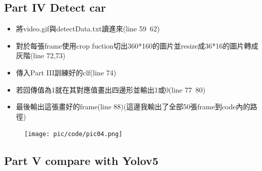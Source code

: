 \documentclass[12,a4paper]{article}
\begin{document}
\subsection{Part IV Detect car}
\begin{itemize}
    \item 將video.gif與detectData.txt讀進來(line 59~62)
    \item 對於每張frame使用crop fuction切出360*160的圖片並resize成36*16的圖片轉成灰階(line 72,73)
    \item 傳入Part III訓練好的clf(line 74)
    \item 若回傳值為1就在其對應值畫出四邊形並輸出1或0(line 77~80)
    \item 最後輸出這張畫好的frame(line 88)(這邊我輸出了全部50張frame到code內的路徑)
\end{itemize}
\begin{figure}[!ht]
\centering
\texttt{[image: pic/code/pic04.png]}
\end{figure}
\FloatBarrier
\subsection{Part V compare with Yolov5}
\end{document}
